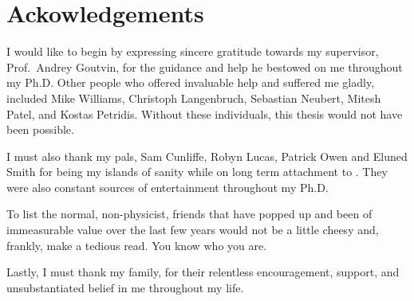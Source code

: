 \clearpage
\chapter*{\centering Ackowledgements}
\begin{center}
  {\setlength{\currentparskip}{\parskip}%
  \begin{minipage}{0.8\textwidth}
    \setlength{\parskip}{\currentparskip}%
    I would like to begin by expressing sincere gratitude towards my supervisor, Prof.~Andrey
    Goutvin, for the guidance and help he bestowed on me throughout my Ph.D.
    Other people who offered invaluable help and suffered me gladly, included
    Mike Williams, Christoph Langenbruch, Sebastian Neubert, Mitesh Patel, and
    Kostas Petridis.
    Without these individuals, this thesis would not have been possible.

    I must also thank my pals, Sam Cunliffe, Robyn Lucas, Patrick Owen and Eluned Smith for being
    my islands of sanity while on long
    term attachment to \cern.
    They were also constant sources of entertainment throughout my Ph.D.

    To list the normal, non-physicist, friends that have popped up and been of immeasurable value
    over the last few years would not be a little cheesy and, frankly, make a tedious read.
    You know who you are.

    Lastly, I must thank my family, for their relentless encouragement, support, and
    unsubstantiated belief in me throughout my life.

  \end{minipage}}
\end{center}



